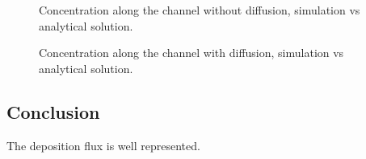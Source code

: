 \begin{figure}[h]
 \centering
 \caption{Concentration along the channel without diffusion,
  simulation vs analytical solution.}
 \label{fig:depot:nodiff}
\end{figure}

\begin{figure}[h]
 \centering
 \caption{Concentration along the channel with diffusion,
  simulation vs analytical solution.}
 \label{fig:depot:diff}
\end{figure}

\subsection{Conclusion}

The deposition flux is well represented.

